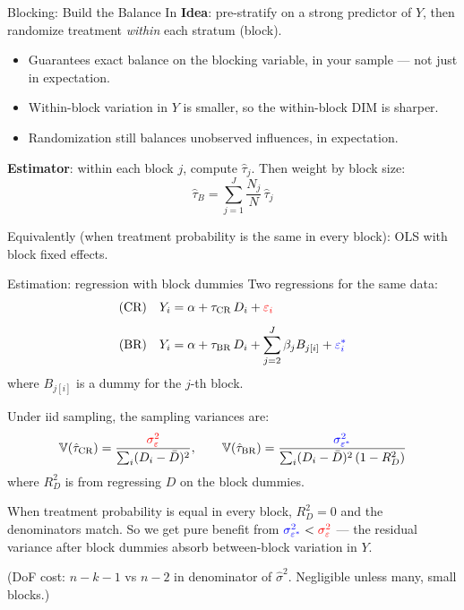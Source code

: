 \documentclass[xcolor=dvipsnames]{beamer}
\newcommand\V{\mathbb{V}}
\begin{document}
\begin{frame}{Blocking: Build the Balance In}
\small
{} \textbf{Idea}: pre-stratify on a strong predictor of $Y$, then randomize treatment \textit{within} each stratum (block).\\
\medskip
\begin{itemize}
\footnotesize
\item<2-> Guarantees exact balance on the blocking variable, in your sample --- not just in expectation.
\item<3-> Within-block variation in $Y$ is smaller, so the within-block DIM is sharper.
\item<4-> Randomization still balances unobserved influences, in expectation.
\end{itemize}

\medskip
{} \textbf{Estimator}: within each block $j$, compute $\hat\tau_j$.  Then weight by block size:
\[
\hat\tau_B = \sum_{j=1}^J \frac{N_j}{N}\, \hat\tau_j
\]

 Equivalently (when treatment probability is the same in every block): OLS with block fixed effects.
\end{frame}


\begin{frame}{Estimation: regression with block dummies}
\small
{} Two regressions for the same data:
\vspace{-4pt}
\begin{align*}
\text{(CR)} \quad Y_i &= \alpha + \tau_{\mathrm{CR}}\, D_i + \textcolor{red}{\varepsilon_i} \\[4pt]
\text{(BR)} \quad Y_i &= \alpha + \tau_{\mathrm{BR}}\, D_i + \sum_{j=2}^J \beta_j B_{j[i]} + \textcolor{blue}{\varepsilon^{*}_i}
\end{align*}
where $B_{j[i]}$ is a dummy for the $j$-th block.

\medskip
{} Under iid sampling, the sampling variances are:
\vspace{-4pt}
\[
\V(\hat\tau_{\mathrm{CR}}) = \frac{\textcolor{red}{\sigma^2_{\varepsilon}}}{\sum_i (D_i - \bar D)^2}, \qquad
\V(\hat\tau_{\mathrm{BR}}) = \frac{\textcolor{blue}{\sigma^2_{\varepsilon^{*}}}}{\sum_i (D_i - \bar D)^2\,(1 - R^2_D)}
\]
where $R^2_D$ is from regressing $D$ on the block dummies.

\medskip
{} \footnotesize When treatment probability is equal in every block, $R^2_D = 0$ and the denominators match.  So we get pure benefit from $\textcolor{blue}{\sigma^2_{\varepsilon^{*}}} < \textcolor{red}{\sigma^2_{\varepsilon}}$ --- the residual variance after block dummies absorb between-block variation in $Y$.

\medskip
{} \footnotesize (DoF cost: $n{-}k{-}1$ vs $n{-}2$ in denominator of $\widehat\sigma^2$.  Negligible unless many, small blocks.)
\end{frame}
\end{document}
